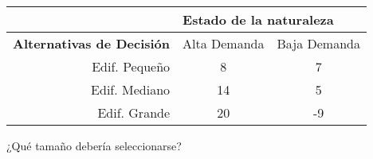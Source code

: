 \begin{table}[H]
    \begin{tabular}{r|cc|}
        \cline{2-3}
        \multicolumn{1}{l|}{}                                   & \multicolumn{2}{l|}{\textbf{Estado de la naturaleza}}                                     \\ \hline
        \multicolumn{1}{|l|}{\textbf{Alternativas de Decisión}} & \multicolumn{1}{l|}{Alta Demanda}                     & \multicolumn{1}{l|}{Baja Demanda} \\ \hline
        \multicolumn{1}{|r|}{Edif. Pequeño}                     & \multicolumn{1}{c|}{8}                                & 7                                 \\
        \multicolumn{1}{|r|}{Edif. Mediano}                     & \multicolumn{1}{c|}{14}                               & 5                                 \\
        \multicolumn{1}{|r|}{Edif. Grande}                      & \multicolumn{1}{c|}{20}                               & -9                                \\ \hline
    \end{tabular}
\end{table}

¿Qué tamaño debería seleccionarse?

\pagebreak